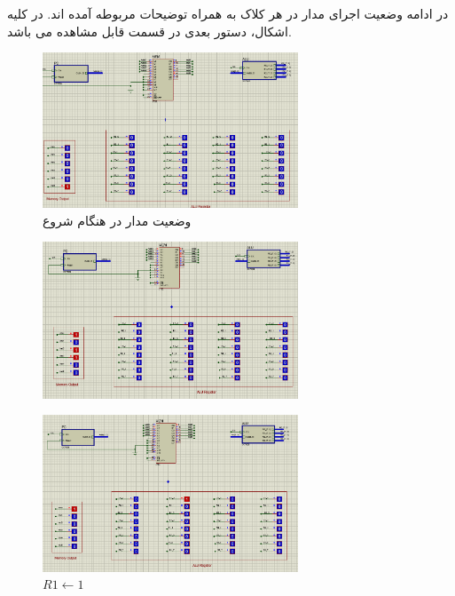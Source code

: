 \documentclass[12pt,onecolumn,a4paper,fleqn]{article}
\begin{document}
 در ادامه وضعیت اجرای مدار در هر کلاک به همراه توضیحات مربوطه آمده اند. در کلیه اشکال، دستور بعدی در قسمت قابل مشاهده می باشد.
 
 \begin{figure}[H]
  	 							\centering
  	 							\includegraphics[width=0.68\textwidth]{source/10.png}
  	 							\caption{وضعیت مدار در هنگام شروع}
  	 							\label{fig:10}
 \end{figure}
 \begin{figure}[H]
  	 							\centering
  	 							\includegraphics[width=0.68\textwidth]{source/11.png}
  	 							\caption{}
  	 							\label{fig:11}
 \end{figure}
 \begin{figure}[H]
  	 							\centering
  	 							\includegraphics[width=0.68\textwidth]{source/12.png}
  	 							\caption{$R1 \leftarrow 1$}
  	 							\label{fig:12}
 \end{figure}
 
\end{document}
